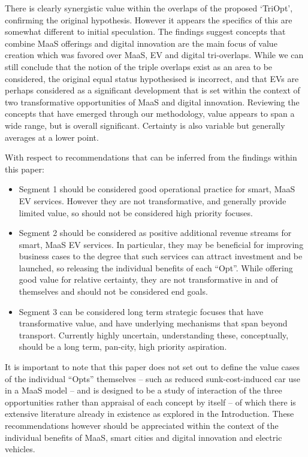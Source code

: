 \documentclass[journal]{IEEEtran}
\begin{document}
There is clearly synergistic value within the overlaps of the proposed
`TriOpt', confirming the original hypothesis. However it appears the
specifics of this are somewhat different to initial speculation. The
findings suggest concepts that combine MaaS offerings and digital
innovation are the main focus of value creation which was favored over
MaaS, EV and digital tri-overlaps. While we can still conclude that
the notion of the triple overlaps exist as an area to be considered,
the original equal status hypothesised is incorrect, and that EVs are
perhaps considered as a significant development that is set within the
context of two transformative opportunities of MaaS and digital
innovation. Reviewing the concepts that have emerged through our
methodology, value appears to span a wide range, but is overall
significant. Certainty is also variable but generally averages at a
lower point.

With respect to recommendations that can be inferred from the findings
within this paper:

\begin{itemize}
\item Segment 1 should be considered good operational practice for
  smart, MaaS EV services. However they are not transformative, and
  generally provide limited value, so should not be considered high
  priority focuses. 
\item Segment 2 should be considered as positive additional revenue
  streams for smart, MaaS EV services. In particular, they may be
  beneficial for improving business cases to the degree that such
  services can attract investment and be launched, so releasing the
  individual benefits of each ``Opt''. While offering good value for
  relative certainty, they are not transformative in and of themselves
  and should not be considered end goals.
\item Segment 3 can be considered long term strategic focuses that
  have transformative value, and have underlying mechanisms that span
  beyond transport. Currently highly uncertain, understanding these,
  conceptually, should be a long term, pan-city, high priority
  aspiration.
\end{itemize}

It is important to note that this paper does not set out to define the
value cases of the individual ``Opts'' themselves -- such as reduced
sunk-cost-induced car use in a MaaS model -- and is designed to be a
study of interaction of the three opportunities rather than appraisal
of each concept by itself -- of which there is extensive literature
already in existence as explored in the Introduction. These
recommendations however should be appreciated within the context of
the individual benefits of MaaS, smart cities and digital innovation
and electric vehicles.
\end{document}
